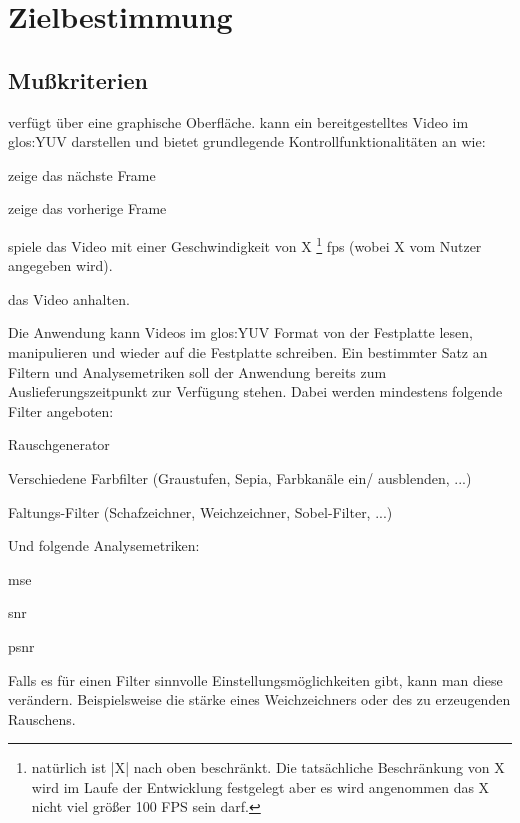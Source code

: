 \chapter{Zielbestimmung}

\section{Mußkriterien}
\setcounter{counterKriterien}{0}
 \projektTitel verfügt über eine graphische Oberfläche.
 \projektTitel kann ein bereitgestelltes Video im \gls{glos:YUV} darstellen und bietet grundlegende Kontrollfunktionalitäten an wie:
\begin{compactitem}
\item zeige das nächste Frame
\item zeige das vorherige Frame
\item spiele das Video mit einer Geschwindigkeit von X \footnote{ natürlich ist |X| nach oben beschränkt. Die tatsächliche Beschränkung von X wird im Laufe der Entwicklung festgelegt aber es wird angenommen das X nicht viel größer 100 FPS sein darf.} \gls{fps} (wobei X vom Nutzer angegeben wird).
\item das Video anhalten.
\end{compactitem} 
 Die Anwendung kann Videos im \gls{glos:YUV} Format von der Festplatte lesen, manipulieren und wieder auf die Festplatte schreiben.
 Ein bestimmter Satz an Filtern und Analysemetriken soll der Anwendung bereits zum Auslieferungszeitpunkt zur Verfügung stehen. 
Dabei werden mindestens folgende Filter angeboten:
\begin{compactitem}
\item Rauschgenerator
\item Verschiedene Farbfilter (Graustufen, Sepia, Farbkanäle ein/ ausblenden, ...)
\item Faltungs-Filter (Schafzeichner, Weichzeichner, Sobel-Filter, ...)
\end{compactitem}
Und folgende Analysemetriken:
\begin{compactitem}
\item \gls{mse}
\item \gls{snr}
\item \gls{psnr}
\end{compactitem}
 Falls es für einen Filter sinnvolle Einstellungsmöglichkeiten gibt, kann man diese verändern. Beispielsweise die stärke eines Weichzeichners oder des zu erzeugenden Rauschens.
